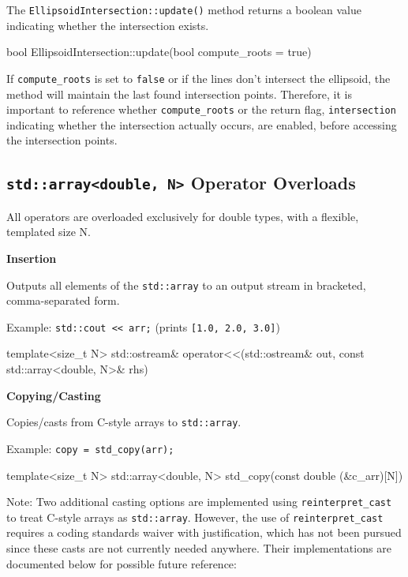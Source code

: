 \documentclass[11pt,fleqn]{report}
\begin{document}
The \texttt{EllipsoidIntersection::update()} method returns a boolean value
indicating whether the intersection exists.

\begin{code}
bool EllipsoidIntersection::update(bool compute_roots = true)
\end{code}

If \texttt{compute\_roots} is set to \texttt{false} or if the lines don't intersect
the ellipsoid, the method will maintain the last found intersection points. Therefore, 
it is important to reference whether \texttt{compute\_roots} or the return flag, 
\texttt{intersection} indicating whether the intersection actually occurs, are enabled,
before accessing the intersection points.

\subsection{\texttt{std::array<double, N>} Operator Overloads}
All operators are overloaded exclusively for double types, with a flexible,
templated size N.

\textbf{Insertion}

Outputs all elements of the \texttt{std::array} to an output stream in bracketed, 
comma-separated form.

Example: \texttt{std::cout << arr;} \qquad (prints \texttt{[1.0, 2.0, 3.0]})
\begin{code}
template<size_t N>
std::ostream& operator<<(std::ostream& out, const std::array<double, N>& rhs)
\end{code}

\textbf{Copying/Casting}

Copies/casts from C-style arrays to \texttt{std::array}.

Example: \texttt{copy = std\_copy(arr);}
\begin{code}
template<size_t N>
std::array<double, N> std_copy(const double (&c_arr)[N])
\end{code}

Note: Two additional casting options are implemented using 
\texttt{reinterpret\_cast} to treat C-style arrays as \texttt{std::array}. 
However, the use of \texttt{reinterpret\_cast} requires a coding standards 
waiver with justification, which has not been pursued since these casts
are not currently needed anywhere. Their implementations are documented
below for possible future reference:
\end{document}
